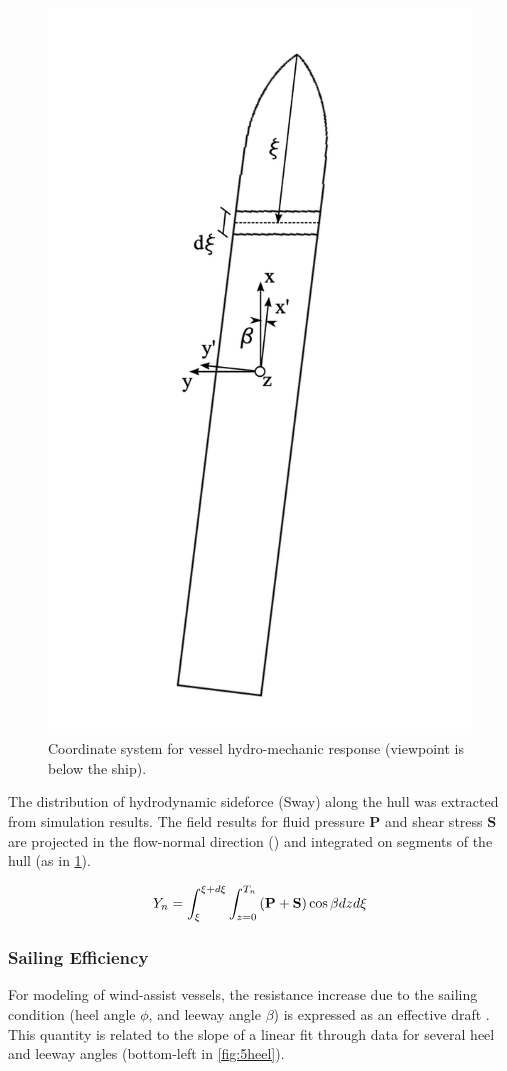\documentclass[twoside,twocolumn]{article}
\begin{document}
\begin{figure}[!ht]
	\centering
	\includegraphics[width=.7\columnwidth]{images/cut_coordinates.png}  %
	\caption{Coordinate system for vessel hydro-mechanic response (viewpoint is below the ship).}
	\label{fig:cutcoord}
\end{figure}


The distribution of hydrodynamic sideforce (Sway) along the hull was extracted from simulation results. The field results for fluid pressure $\mathbf{P}$ and shear stress $\mathbf{S}$ are projected in the flow-normal direction (\nY) and integrated on segments of the hull (as in \cref{fig:cutcoord}).

\begin{equation}
Y_n=\int_{\xi}^{\xi+d\xi} \int_{z=0}^{T_n} \left(\mathbf{P}+\mathbf{S}\right)  \cos{\beta} \space dz \space d\xi
\end{equation}

\subsubsection{Sailing Efficiency}
For modeling of wind-assist vessels, the resistance increase due to the sailing condition (heel angle $\phi$, and leeway angle $\beta$) is expressed as an effective draft \Te. This quantity is related to the slope of a linear fit through data for several heel and leeway angles (bottom-left in \cref{fig:5heel}).
\end{document}
